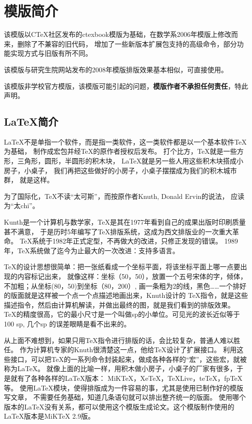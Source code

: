 \section{模版简介}

该模版以CTeX社区发布的ctexbook模版为基础，在数学系2006年模版上修改而来，删除了不兼容的旧代码，
增加了一些新版本扩展包支持的高级命令，部分功能实现方式与旧版有所不同。

该模版与研究生院网站发布的2008年模版排版效果基本相似，可直接使用。

该模版非学校官方模版，该模版可能引起的问题，{\bfseries{}模版作者不承担任何责任}，特此声明。

\subsection{\LaTeX{}{}简介}

\LaTeX{}不是单指一个软件，而是指一类软件，这一类软件都是以一个基本软件\TeX\index{\TeX}为基础，
制作成宏包并经\TeX{}的原作者授权后发布。
打个比方，\TeX{}就是一些方形，三角形，圆形，半圆形的积木块，
\LaTeX{}就是另一些人用这些积木块搭成小房子，小桌子，
我们再把这些做好的小房子，小桌子摆摆成为我们的积木城市群，
就是这样。

为了国际化，\TeX{}不读“太可斯”，而按原作者Knuth, Donald Ervin的说法，
应读为“太chi”\cite{LaTeXshzh}。

Kunth是一个计算机与数学家，\TeX{}是其在1977年看到自己的成果出版时印刷质量甚不满意，
于是历时5年编写了\TeX{}排版系统，这成为西文排版业的一次重大革命。
\TeX{}系统于1982年正式定型，不再做大的改进，只修正发现的错误。
1989年，\TeX{}系统做了迄今为止最大的一次改进：支持多语言\cite{LaTeXshzh}。

\TeX{}的设计思想很简单：把一张纸看成一个坐标平面，将该坐标平面上哪一点要出现的内容标记出来，
就像这样：坐标（50，50），放置一个五号宋体的字，倾体，不加粗；从坐标(80，50)到坐标（80，200）,
画一条粗为2的线，黑色……一个排好的版面就是这样被一个点一个点描述地画出来，Knuth设计的
\TeX{}指令，就是这些描述指令，然后由计算机解读，并做出最终的图，就是我们看到的排版效果。
\TeX 的精度很高，它的最小尺寸是一个叫做sp的小单位。可见光的波长近似等于100 sp,
几个sp 的误差眼睛是看不出来的\cite{texbook}。

从上面不难想到，如果只用\TeX 指令进行排版的话，会比较复杂，普通人难以胜任。
作为计算机专家的Knuth很清楚这一点，他给\TeX 设计了扩展接口。
利用这些接口，可以把\TeX 的一系列命令封装起来，做成各种各样的“宏”，这些宏，就被称为\LaTeX{}。
就像上面的比喻一样，用积木做小房子，小桌子的厂家有很多，于是就有了各种各样的\LaTeX{}版本：
MiKTeX，XeTeX，TeXLive，teTeX，fpTeX等。
使用\LaTeX{}模块，使得排版成为一件容易的事，尤其是使用已制作好的模版写文章，
不需要任务基础，知道几条语句就可以排出整齐统一的版面。
使用哪个版本的\LaTeX{}没有关系，都可以使用这个模版生成论文。这个模版制作使用的LaTeX版本是MiKTeX 2.9版。

